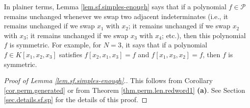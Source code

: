 In plainer terms, Lemma \ref{lem.sf.simples-enough} says that if a polynomial
$f\in\mathcal{P}$ remains unchanged whenever we swap two adjacent
indeterminates (i.e., it remains unchanged if we swap $x_{1}$ with $x_{2}$; it
remains unchanged if we swap $x_{2}$ with $x_{3}$; it remains unchanged if we
swap $x_{3}$ with $x_{4}$; etc.), then this polynomial $f$ is symmetric. For
example, for $N=3$, it says that if a polynomial $f\in K\left[  x_{1}%
,x_{2},x_{3}\right]  $ satisfies $f\left[  x_{2},x_{1},x_{3}\right]  =f$ and
$f\left[  x_{1},x_{3},x_{2}\right]  =f$, then $f$ is symmetric.

\begin{proof}
[Proof of Lemma \ref{lem.sf.simples-enough}.]This follows from Corollary
\ref{cor.perm.generated} or from Theorem \ref{thm.perm.len.redword1}
\textbf{(a)}. See Section \ref{sec.details.sf.sp} for the details of this proof.
\end{proof}
